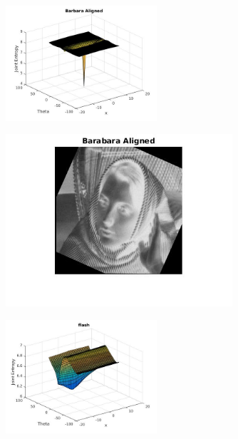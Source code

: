 \documentclass[a4paper]{article}
\begin{document}
\begin{figure}[ht!]
 \centering
\includegraphics[width=0.5\textwidth]{Q5/output/barbara_je.jpg}
\end{figure}
\begin{figure}[ht!]
 \centering
\includegraphics[width=0.75\textwidth]{Q5/output/Barbara_aligned.jpg}
\end{figure}
\begin{figure}[ht!]
 \centering
\includegraphics[width=0.5\textwidth]{Q5/output/noflash_je.jpg}
\end{figure}
\end{document}
